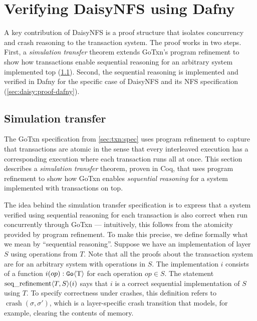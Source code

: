 \section{Verifying DaisyNFS using Dafny}
\label{sec:daisy:proof}

A key contribution of DaisyNFS is a proof structure that isolates concurrency and crash
reasoning to the transaction system. The proof works in two steps. First, a
\emph{simulation transfer} theorem extends GoTxn's program refinement to show
how transactions enable sequential reasoning for an arbitrary system implemented
top (\cref{sec:daisy:simulation-transfer}). Second, the sequential reasoning
is implemented and verified in Dafny for the specific case of DaisyNFS and its
NFS specification (\cref{sec:daisy:proof-dafny}).

\subsection{Simulation transfer}%
\label{sec:daisy:simulation-transfer}

The GoTxn specification from \cref{sec:txn:spec} uses program refinement to
capture that transactions are atomic in the sense that every interleaved
execution has a corresponding execution where each transaction runs all at once.
This section describes a \emph{simulation transfer} theorem, proven in Coq, that
uses program refinement to show how GoTxn enables \emph{sequential
reasoning} for a system implemented with transactions on top.

The idea behind the simulation transfer specification is to express that a system
verified using sequential reasoning for each transaction is also correct when
run concurrently through GoTxn --- intuitively, this follows from the atomicity
provided by program refinement.
To make this precise, we define formally what we mean by
``sequential reasoning''. Suppose we have an
implementation of layer $S$ using operations from $T$. Note that all the proofs
about the transaction system are for an arbitrary system with operations in $S$. The implementation $i$
consists of a function $i(op) : \mathtt{Go}\langle \mathrm{T} \rangle$ for each operation $op \in S$. The statement
$\operatorname{seq\_refinement} \langle T, S \rangle(i)$ says that $i$ is a correct sequential
implementation of $S$ using $T$. To specify correctness under crashes, this
definition refers to $\operatorname{crash}(\sigma, \sigma')$, which is a
layer-specific crash transition that models, for example, clearing the
contents of memory.

